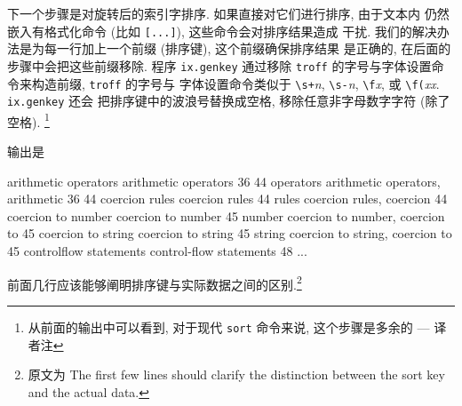 下一个步骤是对旋转后的索引字排序. 如果直接对它们进行排序, 由于文本内
仍然嵌入有格式化命令 (比如 \texttt{[...]}), 这些命令会对排序结果造成
干扰. 我们的解决办法是为每一行加上一个前缀 (排序键), 这个前缀确保排序结果
是正确的, 在后面的步骤中会把这些前缀移除. 程序 \texttt{ix.genkey} 通过移除
\texttt{troff} 的字号与字体设置命令来构造前缀, \texttt{troff} 的字号与
字体设置命令类似于 \verb'\s+'\textit{n}, \verb'\s-'\textit{n},
\verb'\f'\textit{x}, 或 \verb'\f('\textit{xx}. \texttt{ix.genkey} 还会
把排序键中的波浪号替换成空格, 移除任意非字母数字字符 (除了空格).
\footnote{从前面的输出中可以看到, 对于现代 \texttt{sort} 命令来说,
这个步骤是多余的 --- 译者注}
输出是
\begin{awkcode}
    arithmetic operators        arithmetic operators    36 44
    operators arithmetic        operators, arithmetic   36 44
    coercion rules      coercion rules  44
    rules coercion      rules, coercion 44
    coercion to number  coercion to number      45
    number coercion to  number, coercion to     45
    coercion to string  coercion to string      45
    string coercion to  string, coercion to     45
    controlflow statements      control-flow statements 48
    ...
\end{awkcode}
前面几行应该能够阐明排序键与实际数据之间的区别.\footnote{原文为 The first
    few lines should clarify the distinction between the sort key and the
actual data.}

